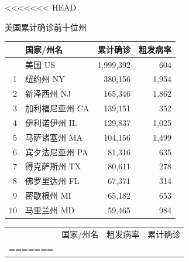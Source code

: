 \documentclass[
]{article}
\begin{document}
\begin{table}[H]
<<<<<<< HEAD
      \centering
    \begin{minipage}{.4\linewidth}
    \caption{美国累计确诊前十位州}
    \vspace{-0.5\baselineskip}
      \centering
    \captionsetup{justification=centering} \begin{table}[H]
\centering\begingroup\fontsize{12}{14}\selectfont

\begin{tabular}{rlrr}
\toprule
  & 国家/州名 & 累计确诊 & 粗发病率\\
\midrule
\rowcolor{gray!6}   & 美国 US & 1,999,392 & 604\\
1 & 纽约州 NY & 380,156 & 1,954\\
\rowcolor{gray!6}  2 & 新泽西州 NJ & 165,346 & 1,862\\
3 & 加利福尼亚州 CA & 139,151 & 352\\
\rowcolor{gray!6}  4 & 伊利诺伊州 IL & 129,837 & 1,025\\
5 & 马萨诸塞州 MA & 104,156 & 1,499\\
\rowcolor{gray!6}  6 & 宾夕法尼亚州 PA & 81,316 & 635\\
7 & 得克萨斯州 TX & 80,611 & 278\\
\rowcolor{gray!6}  8 & 佛罗里达州 FL & 67,371 & 314\\
9 & 密歇根州 MI & 65,182 & 653\\
\rowcolor{gray!6}  10 & 马里兰州 MD & 59,465 & 984\\
\bottomrule
\end{tabular}
\endgroup{}
\end{table} \end{minipage}%
    \begin{minipage}{.6\linewidth}
     \caption{美国粗发病率前十位州}
     \vspace{-0.5\baselineskip}
      \centering
    \captionsetup{justification=centering} \begin{table}[H]
\centering\begingroup\fontsize{12}{14}\selectfont

\begin{tabular}{rlrr}
\toprule
  & 国家/州名 & 粗发病率 & 累计确诊\\
=======
    \centering \begin{table}[H]
\centering\begingroup\fontsize{20}{22}\selectfont


\end{table}
\end{tabular}
\end{table}
\end{minipage}
\end{table}
\end{document}
